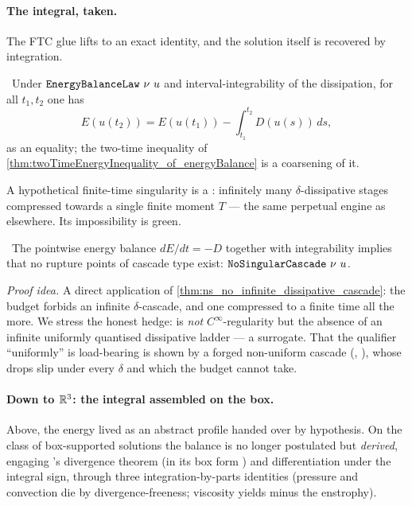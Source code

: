 \paragraph{The integral, taken.}
The FTC glue lifts to an exact identity, and the solution itself is recovered by integration.

\begin{theorem}\label{thm:energy_identity_of_energyBalance}
\green{}\ Under $\texttt{EnergyBalanceLaw}\ \nu\ u$ and interval-integrability of the dissipation, for
all $t_1,t_2$ one has
\begin{equation}\label{eq:ns-energy-identity}
E(u(t_2)) = E(u(t_1)) - \int_{t_1}^{t_2} D(u(s))\,ds,
\end{equation}
as an equality; the two-time inequality of
\cref{thm:twoTimeEnergyInequality_of_energyBalance} is a coarsening of it.
\end{theorem}

A hypothetical finite-time singularity is a : infinitely many
$\delta$-dissipative stages compressed towards a single finite moment $T$ --- the same perpetual
engine as elsewhere. Its impossibility is green.

\begin{theorem}\label{thm:noSingularCascade_of_energyBalance}
\green{}\ The pointwise energy balance $dE/dt = -D$ together with integrability implies that no
rupture points of cascade type exist: $\code{NoSingularCascade}\ \nu\ u$.
\end{theorem}

\emph{Proof idea.} A direct application of \cref{thm:ns_no_infinite_dissipative_cascade}: the budget
forbids an infinite $\delta$-cascade, and one compressed to a finite time all the more. We stress
the honest hedge:  is \emph{not} $C^\infty$-regularity but the absence of an
infinite uniformly quantised dissipative ladder --- a surrogate. That the qualifier ``uniformly''
is load-bearing is shown by a forged non-uniform cascade
(, \green{}), whose drops slip under every $\delta$ and
which the budget cannot take.

\paragraph{Down to $\mathbb{R}^3$: the integral assembled on the box.}
Above, the energy lived as an abstract profile handed over by hypothesis. On the class of
box-supported solutions the balance is no longer postulated but \emph{derived}, engaging
's divergence theorem (in its box form
) and differentiation under the integral
sign, through three integration-by-parts identities (pressure and convection die by
divergence-freeness; viscosity yields minus the enstrophy).

